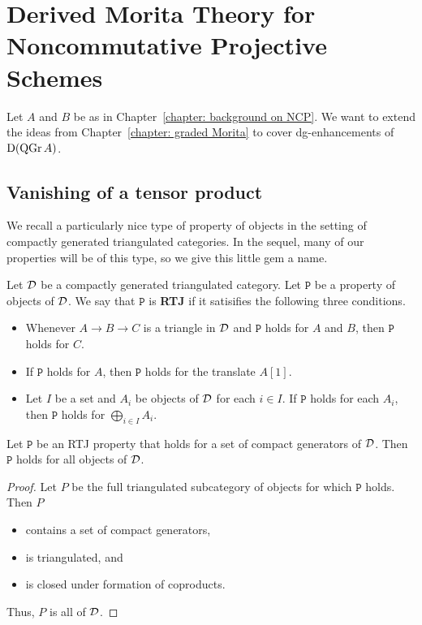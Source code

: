 \chapter{Derived Morita Theory for Noncommutative Projective Schemes} \label{section: morita for NCP}

Let \(A\) and \(B\) be as in Chapter~\ref{chapter: background on NCP}. We want to extend the ideas from Chapter~\ref{chapter: graded Morita} to cover dg-enhancements of \(\mathrm{D}(\operatorname{QGr}A)\). 

\section{Vanishing of a tensor product} \label{subsection: vanishing of tensor}

We recall a particularly nice type of property of objects in the setting of compactly generated triangulated categories.
In the sequel, many of our properties will be of this type, so we give this little gem a name.

\begin{definition} \label{definition: run the jewels}
  Let \(\mathcal{D}\) be a compactly generated triangulated category.
  Let \(\mathtt{P}\) be a property of objects of \(\mathcal{D}\). 
  We say that \(\mathtt{P}\) is \textbf{RTJ} if it satisifies the following three conditions.
  \begin{itemize}
  \item Whenever \(A \to B \to C\) is a triangle in \(\mathcal{D}\) and \(\mathtt{P}\) holds for \(A\) and \(B\), then \(\mathtt{P}\) holds for \(C\). 
  \item If \(\mathtt{P}\) holds for \(A\), then \(\mathtt{P}\) holds for the translate \(A[1]\).
  \item Let \(I\) be a set and \(A_i\) be objects of \(\mathcal{D}\) for each \(i \in I\). If \(\mathtt{P}\) holds for each \(A_i\), then \(\mathtt{P}\) holds for \(\bigoplus_{i \in I} A_i\). 
  \end{itemize}
\end{definition}

\begin{proposition} \label{proposition: RTJ properties}
  Let \(\mathtt{P}\) be an RTJ property that holds for a set of compact generators of \(\mathcal{D}\). Then \(\mathtt{P}\) holds for all objects of \(\mathcal{D}\).
\end{proposition}

\begin{proof}
  Let \(P\) be the full triangulated subcategory of objects for which \(\mathtt{P}\) holds. Then \(P\)
  \begin{itemize}
  \item contains a set of compact generators,
  \item is triangulated, and
  \item is closed under formation of coproducts. 
  \end{itemize}
  Thus, \(P\) is all of \(\mathcal{D}\). 
\end{proof}


